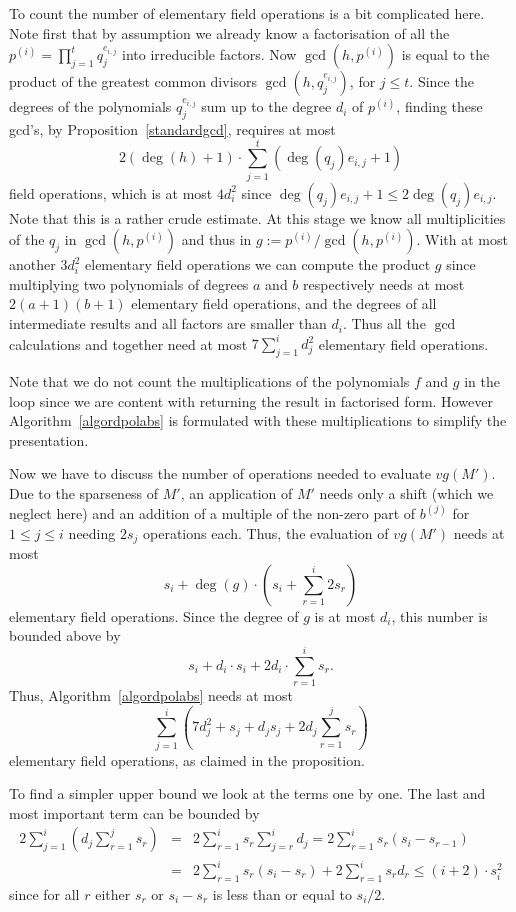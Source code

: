 To count the number of elementary field operations is a bit complicated
here. Note first that by assumption we already know a factorisation of all the
$p^{(i)} = \prod_{j=1}^t q_j^{e_{i,j}}$ into
irreducible factors. Now  $\gcd(h,p^{(i)})$ is equal to the product of
the greatest common divisors $\gcd(h,q_j^{e_{i,j}})$, for $j\leq t$. Since the degrees of the
polynomials  $q_j^{e_{i,j}}$ sum up to the degree $d_i$ of $p^{(i)}$, finding these gcd's, by 
Proposition~\ref{standardgcd}, requires at most
\[ 
2(\deg(h)+1) \cdot \sum_{j=1}^t \left(\deg(q_j) e_{i,j} + 1\right) 
\] 
field operations, which is at most $4d_i^2$ since
$\deg(q_j) e_{i,j} + 1 \le 2 \deg(q_j) e_{i,j}$. Note that this is a rather
crude estimate. At this stage we know all multiplicities of the
$q_j$ in $\gcd(h,p^{(i)})$ and thus in $g := p^{(i)}/\gcd(h,p^{(i)})$.
With at most
another $3d_i^2$ elementary field operations we can compute the product
$g$ since multiplying two polynomials of degrees $a$ and $b$ respectively
needs at most $2(a+1)(b+1)$ elementary field operations, and the degrees 
of all intermediate results and all factors are smaller than $d_i$. Thus all the
$\gcd$ calculations and together need at most $7\sum_{j=1}^i d_j^2$
elementary field operations.

Note that we do not count the multiplications of the polynomials $f$ and $g$ in 
the loop since we are content with returning the result in factorised
form. However Algorithm~\ref{algordpolabs} is formulated with these
multiplications to simplify the presentation.


Now we have to
discuss the number of operations needed to evaluate $v g(M')$.
Due to the sparseness of $M'$, an application of $M'$ needs only a shift
(which we neglect here) and an addition of a multiple of the non-zero
part of $b^{(j)}$ for $1 \le j \le i$ needing $2s_j$ operations each.
Thus, the evaluation of $v g(M')$ needs at most
\[ 
s_i + \deg(g) \cdot \left( s_i + \sum_{r=1}^i 2s_r \right) 
\]
elementary field operations. Since the degree of $g$ is at most
$d_i$, this number is bounded above by
\[ 
s_i + d_i \cdot s_i + 2d_i \cdot \sum_{r=1}^i s_r. 
\]
Thus, Algorithm~\ref{algordpolabs} needs at most
\[ 
\sum_{j=1}^i \left( 7d_j^2 + s_j + d_j s_j + 2d_j \sum_{r=1}^j s_r \right) 
\]
elementary field operations, as claimed in the proposition.

To find a simpler upper bound we look at the terms one by one. The
last and most important term can be bounded by
\begin{eqnarray*}
 2\sum_{j=1}^i \left( d_j \sum_{r=1}^j s_r \right)
   &=& 2 \sum_{r=1}^i s_r \sum_{j=r}^i d_j
   = 2 \sum_{r=1}^i s_r (s_i - s_{r-1}) \\
   &=& 2 \sum_{r=1}^i s_r (s_i - s_r) + 2 \sum_{r=1}^i s_r d_r
   \le (i+2) \cdot s_i^2
\end{eqnarray*}
since for all $r$ either $s_r$ or $s_i-s_r$ is less than or equal to
$s_i/2$.

